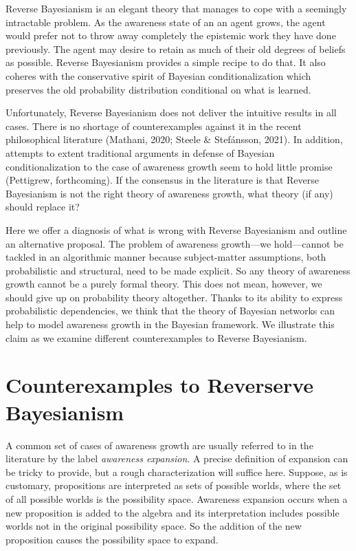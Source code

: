 \documentclass[
  11pt,
  dvipsnames,enabledeprecatedfontcommands]{scrartcl}
\begin{document}
Reverse Bayesianism is an elegant theory that manages to cope with a
seemingly intractable problem. As the awareness state of an an agent
grows, the agent would prefer not to throw away completely the epistemic
work they have done previously. The agent may desire to retain as much
of their old degrees of beliefs as possible. Reverse Bayesianism
provides a simple recipe to do that. It also coheres with the
conservative spirit of Bayesian conditionalization which preserves the
old probability distribution conditional on what is learned.

Unfortunately, Reverse Bayesianism does not deliver the intuitive
results in all cases. There is no shortage of counterexamples against it
in the recent philosophical literature (Mathani, 2020; Steele \&
Stefánsson, 2021). In addition, attempts to extent traditional arguments
in defense of Bayesian conditionalization to the case of awareness
growth seem to hold little promise (Pettigrew, forthcoming). If the
consensus in the literature is that Reverse Bayesianism is not the right
theory of awareness growth, what theory (if any) should replace it?

Here we offer a diagnosis of what is wrong with Reverse Bayesianism and
outline an alternative proposal. The problem of awareness growth---we
hold---cannot be tackled in an algorithmic manner because subject-matter
assumptions, both probabilistic and structural, need to be made
explicit. So any theory of awareness growth cannot be a purely formal
theory. This does not mean, however, we should give up on probability
theory altogether. Thanks to its ability to express probabilistic
dependencies, we think that the theory of Bayesian networks can help to
model awareness growth in the Bayesian framework. We illustrate this
claim as we examine different counterexamples to Reverse Bayesianism.

\hypertarget{counterexamples-to-reverserve-bayesianism}{%
\section{Counterexamples to Reverserve
Bayesianism}\label{counterexamples-to-reverserve-bayesianism}}

\label{sec:counterexamples}

A common set of cases of awareness growth are usually referred to in the
literature by the label \emph{awareness expansion}. A precise definition
of expansion can be tricky to provide, but a rough characterization will
suffice here. Suppose, as is customary, propositions are interpreted as
sets of possible worlds, where the set of all possible worlds is the
possibility space. Awareness expansion occurs when a new proposition is
added to the algebra and its interpretation includes possible worlds not
in the original possibility space. So the addition of the new
proposition causes the possibility space to expand.
\end{document}
